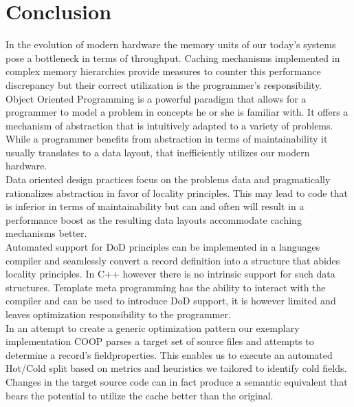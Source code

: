 

\section{Conclusion}\label{conclusion}
In the evolution of modern hardware the memory units of our today's systems pose a bottleneck in terms of throughput. Caching mechanisms implemented in complex memory hierarchies provide measures to counter this performance discrepancy but their correct utilization is the programmer's responsibility.\\
Object Oriented Programming is a powerful paradigm that allows for a programmer to model a problem in concepts he or she is familiar with. It offers a mechanism of abstraction that is intuitively adapted to a variety of problems. While a programmer benefits from abstraction in terms of maintainability it usually translates to a data layout, that inefficiently utilizes our modern hardware.\\
Data oriented design practices focus on the problems data and pragmatically rationalizes abstraction in favor of locality principles. This may lead to code that is inferior in terms of maintainability but can and often will result in a performance boost as the resulting data layouts accommodate caching mechanisms better.\\
Automated support for DoD principles can be implemented in a languages compiler and seamlessly convert a record definition into a structure that abides locality principles. In C++ however there is no intrinsic support for such data structures. Template meta programming has the ability to interact with the compiler and can be used to introduce DoD support, it is however limited and leaves optimization responsibility to the programmer.\\
In an attempt to create a generic optimization pattern our exemplary implementation COOP parses a target set of source files and attempts to determine a record's fieldproperties. This enables us to execute an automated Hot/Cold split based on metrics and heuristics we tailored to identify cold fields. Changes in the target source code can in fact produce a semantic equivalent that bears the potential to utilize the cache better than the original.\\\\
